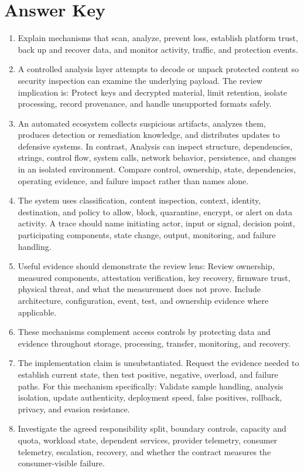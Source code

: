 \documentclass[11pt]{article}
\begin{document}
\section{Answer Key}
\begin{enumerate}
\item Explain mechanisms that scan, analyze, prevent loss, establish platform trust, back up and recover data, and monitor activity, traffic, and protection events.
\item A controlled analysis layer attempts to decode or unpack protected content so security inspection can examine the underlying payload. The review implication is: Protect keys and decrypted material, limit retention, isolate processing, record provenance, and handle unsupported formats safely.
\item An automated ecosystem collects suspicious artifacts, analyzes them, produces detection or remediation knowledge, and distributes updates to defensive systems. In contrast, Analysis can inspect structure, dependencies, strings, control flow, system calls, network behavior, persistence, and changes in an isolated environment. Compare control, ownership, state, dependencies, operating evidence, and failure impact rather than names alone.
\item The system uses classification, content inspection, context, identity, destination, and policy to allow, block, quarantine, encrypt, or alert on data activity. A trace should name initiating actor, input or signal, decision point, participating components, state change, output, monitoring, and failure handling.
\item Useful evidence should demonstrate the review lens: Review ownership, measured components, attestation verification, key recovery, firmware trust, physical threat, and what the measurement does not prove. Include architecture, configuration, event, test, and ownership evidence where applicable.
\item These mechanisms complement access controls by protecting data and evidence throughout storage, processing, transfer, monitoring, and recovery.
\item The implementation claim is unsubstantiated. Request the evidence needed to establish current state, then test positive, negative, overload, and failure paths. For this mechanism specifically: Validate sample handling, analysis isolation, update authenticity, deployment speed, false positives, rollback, privacy, and evasion resistance.
\item Investigate the agreed responsibility split, boundary controls, capacity and quota, workload state, dependent services, provider telemetry, consumer telemetry, escalation, recovery, and whether the contract measures the consumer-visible failure.

\end{enumerate}
\end{document}
